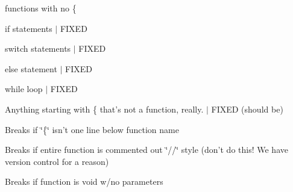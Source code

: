 \begin{DoxyEnumerate}
\item functions with no \{
\end{DoxyEnumerate}
\begin{DoxyEnumerate}
\item if statements $\vert$ F\+I\+X\+E\+D
\end{DoxyEnumerate}
\begin{DoxyEnumerate}
\item switch statements $\vert$ F\+I\+X\+E\+D
\end{DoxyEnumerate}
\begin{DoxyEnumerate}
\item else statement $\vert$ F\+I\+X\+E\+D
\end{DoxyEnumerate}
\begin{DoxyEnumerate}
\item while loop $\vert$ F\+I\+X\+E\+D
\end{DoxyEnumerate}
\begin{DoxyEnumerate}
\item Anything starting with \{ that's not a function, really. $\vert$ F\+I\+X\+E\+D (should be)
\end{DoxyEnumerate}
\begin{DoxyEnumerate}
\item Breaks if \char`\"{}\{\char`\"{} isn't one line below function name
\end{DoxyEnumerate}
\begin{DoxyEnumerate}
\item Breaks if entire function is commented out \char`\"{}//\char`\"{} style (don't do this! We have version control for a reason)
\end{DoxyEnumerate}
\begin{DoxyEnumerate}
\item Breaks if function is void w/no parameters 
\end{DoxyEnumerate}